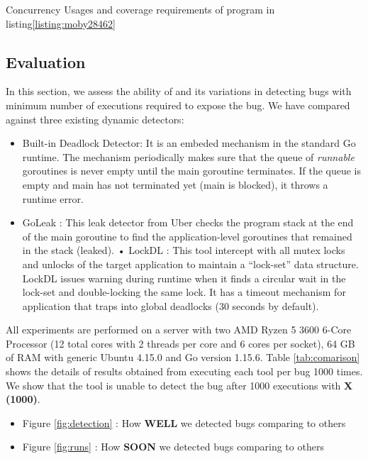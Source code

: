\begin{table}[]
\centering
\caption{Concurrency Usages and coverage requirements of program in listing\ref{listing:moby28462}}
\scalebox{0.9}{

}
\label{tab:moby_cov_table}
\end{table}


\subsection{Evaluation}
In this section, we assess the ability of \goat and its variations in detecting bugs with minimum number of executions required to expose the bug.
%
We have compared \goat against three existing dynamic detectors:
\begin{itemize}
\item Built-in Deadlock Detector: It is an embeded mechanism in the standard Go runtime. The mechanism periodically makes sure that the queue of \textit{runnable} goroutines is never empty until the main goroutine terminates. If the queue is empty and main has not terminated yet (\ie main is blocked), it throws a runtime error.
  \item GoLeak \cite{goleak}: This leak detector from Uber checks the program stack at the end of the main goroutine to find the application-level goroutines that remained in the stack (\ie leaked).
• LockDL \cite{lockdl}: This tool intercept with all mutex locks and unlocks of the target application to maintain a ``lock-set'' data structure. LockDL issues warning during runtime when it finds a circular wait in the lock-set and double-locking the same lock. It has a timeout mechanism for application that traps into global deadlocks (30 seconds by default).
\end{itemize}

All experiments are performed on a server with two AMD Ryzen 5 3600 6-Core Processor (12 total cores with 2 threads per core and 6 cores per socket), 64 GB of RAM with generic Ubuntu 4.15.0 and Go version 1.15.6.
%
Table \ref{tab:comarison} shows the details of results obtained from executing each tool per bug 1000 times.
%
We show that the tool is unable to detect the bug after 1000 executions with \textbf{X (1000)}.

\begin{itemize}
  \item Figure \ref{fig:detection} : How \textbf{WELL} we detected bugs comparing to others
  \item Figure \ref{fig:runs} : How \textbf{SOON} we detected bugs comparing to others
\end{itemize}



